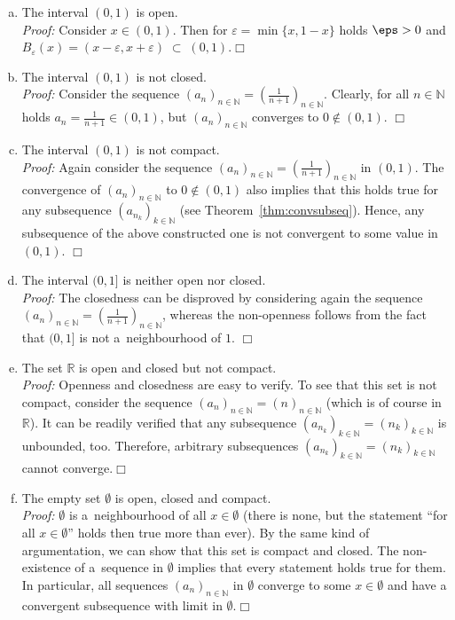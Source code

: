 \begin{example}
 \begin{enumerate}[(a)]
\item The interval $(0,1)$ is open. \\
{\em Proof:} Consider $x\in(0,1)$. Then for $\varepsilon=\min\{x,1-x\}$ holds $\eps>0$ and \linebreak$B_\varepsilon(x)=(x-\varepsilon,x+\varepsilon)\;\subset\;(0,1)$.\hfill$\Box$
\item The interval $(0,1)$ is not closed.\\
{\em Proof:} Consider the sequence $(a_n)_{n\in\mathbb{N}}=(\frac1{n+1})_{n\in\mathbb{N}}$. Clearly, for all $n\in\mathbb{N}$ holds $a_n=\frac1{n+1}\in(0,1)$, but $(a_n)_{n\in\mathbb{N}}$ converges to $0\notin(0,1)$.
\hfill$\Box$
\item The interval $(0,1)$ is not compact.\\
{\em Proof:} Again consider the sequence $(a_n)_{n\in\mathbb{N}}=(\frac1{n+1})_{n\in\mathbb{N}}$ in $(0,1)$. The convergence of $(a_n)_{n\in\mathbb{N}}$ to $0\notin(0,1)$ also implies that this holds true for any subsequence $(a_{n_k})_{k\in\mathbb{N}}$ (see Theorem~\ref{thm:convsubseq}). Hence, any subsequence of the above constructed one is not convergent to some value in $(0,1)$.
\hfill$\Box$
\item The interval $(0,1]$ is neither open nor closed.\\
{\em Proof:} The closedness can be disproved by considering again the sequence \linebreak$(a_n)_{n\in\mathbb{N}}=(\frac1{n+1})_{n\in\mathbb{N}}$, whereas the non-openness follows from the fact that $(0,1]$ is not a~neighbourhood of $1$.
\hfill$\Box$
\item The set $\mathbb{R}$ is open and closed but not compact.\\
{\em Proof:} Openness and closedness are easy to verify. To see that this set is not compact, consider the sequence $(a_n)_{n\in\mathbb{N}}=(n)_{n\in\mathbb{N}}$ (which is of course in $\mathbb{R}$). It can be readily verified that any subsequence $(a_{n_k})_{k\in\mathbb{N}}=(n_k)_{k\in\mathbb{N}}$ is unbounded, too. Therefore, arbitrary subsequences $(a_{n_k})_{k\in\mathbb{N}}=(n_k)_{k\in\mathbb{N}}$ cannot converge.\hfill$\Box$
\item The empty set $\emptyset$ is open, closed and compact.\\
{\em Proof:}
$\emptyset$ is a~neighbourhood of all $x\in\emptyset$ (there is none, but the statement ``for all $x\in\emptyset$'' holds then true more than ever). By the same kind of argumentation, we can show that this set is compact and closed. The non-existence of a~sequence in $\emptyset$ implies that every statement holds true for them. In particular, all sequences $(a_{n})_{n\in\mathbb{N}}$ in $\emptyset$ converge to some $x\in\emptyset$ and have a convergent subsequence with limit in $\emptyset$.\hfill$\Box$
\end{enumerate}
\end{example}

